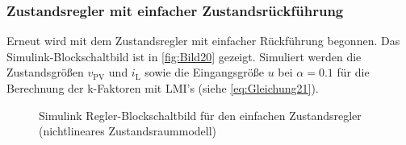 \subsubsection{Zustandsregler mit einfacher Zustandsrückführung}

Erneut wird mit dem Zustandsregler mit einfacher Rückführung begonnen. Das Simulink-Blockschaltbild ist in \autoref{fig:Bild20} gezeigt. Simuliert werden die Zustandsgrößen $v_{\mathrm{PV}}$ und $i_{\mathrm{L}}$ sowie die Eingangsgröße $u$ bei $\alpha = 0.1$ für die Berechnung der k-Faktoren mit LMI's (siehe \autoref{eq:Gleichung21}).

\begin{figure}[H]
    \centering
    \caption[Einfacher Zustandsregler Simulink (nicht-linear)]{Simulink Regler-Blockschaltbild für den einfachen Zustandsregler (nichtlineares Zustandsraummodell)}
    \label{fig:Bild20}
\end{figure}


